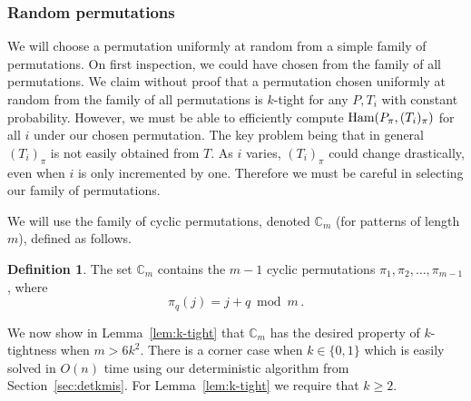 \documentclass[11pt]{article}
\renewcommand{\geq}{\geqslant}
\newcommand{\ham}{\ensuremath{\textup{Ham}}}
\newcommand{\Fam}{\ensuremath{\mathbb{C}_m}}
\theoremstyle{plain}
\theoremstyle{definition}
\newtheorem{definition}[theorem]{Definition}
\begin{document}
\subsubsection{Random permutations} \label{sec:permutations}

We will choose a permutation uniformly at random  from a simple family of permutations. On first inspection, we could have chosen from the family of all permutations. We claim without proof that a permutation chosen uniformly at random from the family of all permutations is $k$-tight for any $P,T_i$ with constant probability. However, we must be able to efficiently compute  $\ham(P_\pi,(T_i)_{\pi})$ for all $i$ under our chosen permutation. The key problem being that in general $(T_i)_\pi$ is not easily obtained from $T$. As $i$ varies, $(T_i)_\pi$ could change drastically, even when $i$ is only incremented by one. Therefore we must be careful in selecting our family of permutations.

We will use the family of cyclic permutations, denoted $\Fam$ (for patterns of length $m$), defined as follows.

\begin{definition}
    \label{dfn:cperm}
    The set $\Fam$ contains the $m-1$ cyclic permutations $\pi_1,\pi_2,\ldots, \pi_{m-1}$, where
\begin{equation*}
        \pi_q(j) = j + q \bmod m \,.
    \end{equation*}
\end{definition}

We now show in Lemma~\ref{lem:k-tight} that $\Fam$ has the desired property of $k$-tightness when $m > 6k^2$. There is a corner case when $k\in\{0,1\}$ which is easily solved in $O(n)$ time using our deterministic algorithm from Section~\ref{sec:detkmis}. For Lemma~\ref{lem:k-tight} we require that $k\geq 2$.
\end{document}
